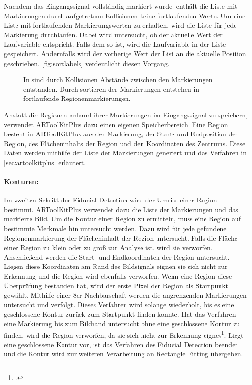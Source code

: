 Nachdem das Eingangssignal vollständig markiert wurde, enthält die Liste mit Markierungen durch aufgetretene Kollisionen
 keine fortlaufenden Werte. Um eine Liste mit fortlaufenden Markierungswerten zu erhalten, wird die Liste für jede
 Markierung durchlaufen. Dabei wird untersucht, ob der aktuelle Wert der Laufvariable entspricht. Falls dem so ist,
 wird die Laufvariable in der Liste gespeichert. Andernfalls wird der vorherige Wert der List an die aktuelle Position
 geschrieben. \autoref{fig:sortlabels} verdeutlicht diesen Vorgang.
\begin{figure}[!ht]
	\centering
	\caption{In  sind durch Kollisionen Abstände zwischen den Markierungen entstanden. Durch
	 sortieren der Markierungen entstehen in  fortlaufende Regionenmarkierungen.}
	\label{fig:sortlabels}
\end{figure}

Anstatt die Regionen anhand ihrer Markierungen im Eingangssignal zu speichern, verwendet ARToolKitPlus dazu einen
 eigenen Speicherbereich. Eine Region besteht in ARToolKitPlus aus der Markierung, der Start- und Endposition der
 Region, des Flächeninhalts der Region und den Koordinaten des Zentrums. Diese Daten werden mithilfe der Liste der
 Markierungen generiert und das Verfahren in \autoref{sec:artoolkitplus} erläutert.

\paragraph{Konturen:} %
\label{par:konturen}
Im zweiten Schritt der Fiducial Detection wird der Umriss einer Region bestimmt. ARToolKitPlus verwendet dazu die Liste
 der Markierungen und das markierte Bild. Um die Kontur einer Region zu ermitteln, muss eine Region auf bestimmte
 Merkmale hin untersucht werden. Dazu wird für jede gefundene Regionenmarkierung der Flächeninhalt der Region
 untersucht. Falls die Fläche einer Region zu klein oder zu groß zur Analyse ist, wird sie verworfen. Anschließend
 werden die Start- und Endkoordinaten der Region untersucht. Liegen diese Koordinaten am Rand des Bildsignals eignen
 sie sich nicht zur Erkennung und die Region wird ebenfalls verworfen. Wenn eine Region diese Überprüfung bestanden
 hat, wird der erste Pixel der Region als Startpunkt gewählt. Mithilfe einer 8er-Nachbarschaft werden die angrenzenden
 Markierungen untersucht und verfolgt. Dieses Verfahren wird solange wiederholt, bis es eine geschlossene Kontur zurück
 zum Startpunkt finden konnte. Hat das Verfahren eine Markierung bis zum Bildrand untersucht ohne eine geschlossene
 Kontur zu finden, wird die Region verworfen, da sie sich nicht zur Erkennung
 eignet\footcite[Vgl.][S.~41--42]{wagner07a}. Liegt eine geschlossene Kontur vor, ist das Verfahren des Fiducial
 Detection beendet und die Kontur wird zur weiteren Verarbeitung an Rectangle Fitting übergeben.

